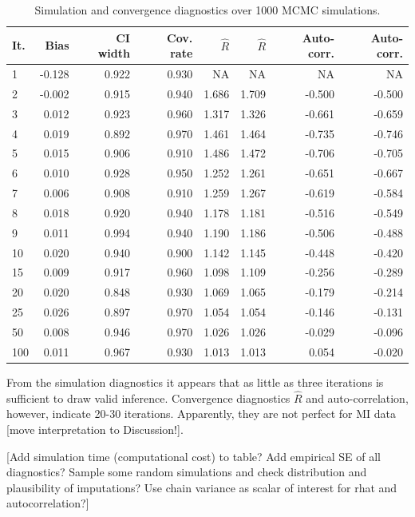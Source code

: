 \documentclass[article]{jss}
\begin{document}
\begin{table}[ht]
\centering
\caption{Simulation and convergence diagnostics over 1000 MCMC simulations.} 
\label{results}
\begin{tabular}{lrrrrrrr}
  \hline
It. & Bias & CI width & Cov. rate & $\widehat{R}$ & $\widehat{R}$ & Auto-corr. & Auto-corr. \\ 
  \hline
   1 & -0.128 & 0.922 & 0.930 & NA & NA & NA & NA \\ 
     2 & -0.002 & 0.915 & 0.940 & 1.686 & 1.709 & -0.500 & -0.500 \\ 
     3 & 0.012 & 0.923 & 0.960 & 1.317 & 1.326 & -0.661 & -0.659 \\ 
     4 & 0.019 & 0.892 & 0.970 & 1.461 & 1.464 & -0.735 & -0.746 \\ 
     5 & 0.015 & 0.906 & 0.910 & 1.486 & 1.472 & -0.706 & -0.705 \\ 
     6 & 0.010 & 0.928 & 0.950 & 1.252 & 1.261 & -0.651 & -0.667 \\ 
     7 & 0.006 & 0.908 & 0.910 & 1.259 & 1.267 & -0.619 & -0.584 \\ 
     8 & 0.018 & 0.920 & 0.940 & 1.178 & 1.181 & -0.516 & -0.549 \\ 
     9 & 0.011 & 0.994 & 0.940 & 1.190 & 1.186 & -0.506 & -0.488 \\ 
    10 & 0.020 & 0.940 & 0.900 & 1.142 & 1.145 & -0.448 & -0.420 \\ 
    15 & 0.009 & 0.917 & 0.960 & 1.098 & 1.109 & -0.256 & -0.289 \\ 
    20 & 0.020 & 0.848 & 0.930 & 1.069 & 1.065 & -0.179 & -0.214 \\ 
    25 & 0.026 & 0.897 & 0.970 & 1.054 & 1.054 & -0.146 & -0.131 \\ 
    50 & 0.008 & 0.946 & 0.970 & 1.026 & 1.026 & -0.029 & -0.096 \\ 
   100 & 0.011 & 0.967 & 0.930 & 1.013 & 1.013 & 0.054 & -0.020 \\ 
   \hline
\end{tabular}
\end{table}

From the simulation diagnostics it appears that as little as three iterations is sufficient to draw valid inference. Convergence diagnostics $\widehat{R}$ and auto-correlation, however, indicate 20-30 iterations. Apparently, they are not perfect for MI data [move interpretation to Discussion!]. 

[Add simulation time (computational cost) to table? Add empirical SE of all diagnostics? Sample some random simulations and check distribution and plausibility of imputations? Use chain variance as scalar of interest for rhat and autocorrelation?]
\end{document}
